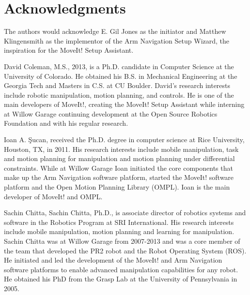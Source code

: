 \documentclass[10pt,journal,compsoc]{joser1}
\begin{document}
{\section*{Acknowledgments}
The authors would acknowledge E. Gil Jones as the initiator and Matthew Klingensmith as the implementor of the Arm Navigation Setup Wizard, the inspiration for the MoveIt! Setup Assistant.





\begin{IEEEbiography}[{coleman}]{David Coleman}, M.S., 2013, is a Ph.D. candidate in Computer Science at the University of Colorado. He obtained his B.S. in Mechanical Engineering at the Georgia Tech and Masters in C.S. at CU Boulder. David's research interests include robotic manipulation, motion planning, and controls. He is one of the main developers of MoveIt!, creating the MoveIt! Setup Assistant while interning at Willow Garage continuing development at the Open Source Robotics Foundation and with his regular research.
\end{IEEEbiography}

\begin{IEEEbiography}[{ioan}]{Ioan A. \c{S}ucan}, 
received the Ph.D. degree in computer science at Rice University,
Houston, TX, in 2011. His research interests include mobile
manipulation, task and motion planning for manipulation and motion
planning under differential constraints. While at Willow Garage
Ioan initiated the core components that make up the Arm
Navigation software platform, started the MoveIt! software platform
and the Open Motion Planning Library (OMPL). Ioan is the main
developer of MoveIt! and OMPL.
\end{IEEEbiography}

\begin{IEEEbiography}[{}]{Sachin Chitta}, Sachin Chitta, Ph.D., is associate director of robotics systems and software in the Robotics Program at SRI International. His research interests include mobile manipulation, motion planning and learning for manipulation. Sachin Chitta was at Willow Garage from 2007-2013 and was a core member of the team that developed the PR2 robot and the Robot Operating System (ROS). He initiated and led the development of the MoveIt! and Arm Navigation software platforms to enable advanced manipulation capabilities for any robot. He obtained his PhD from the Grasp Lab at the University of Pennsylvania in 2005.  
\end{IEEEbiography}

}
\end{document}
